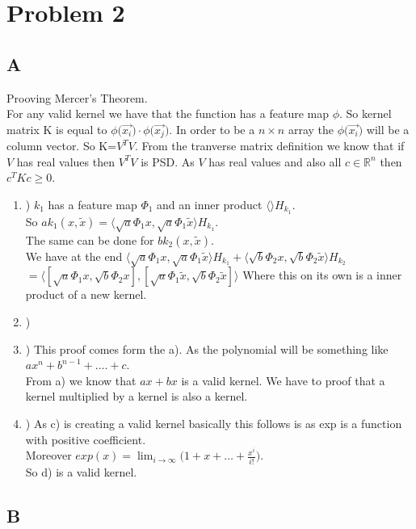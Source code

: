 \section{Problem 2}
\subsection{A}
Prooving Mercer's Theorem.\\
For any valid kernel we have that the function has a feature map $\phi$.
So kernel matrix K is equal to $\phi\big( \overrightarrow{x_i}\big) \cdot \phi\big( \overrightarrow{x_j}\big)$.
In order to be a $n\times n$ array the $\phi\big( \overrightarrow{x_i}\big)$ will be a column vector.
So K=$V^TV$. From the tranverse matrix definition we know that if $V$ has real values then $V^TV$ is 
PSD. As $V$ has real values and also all $c \in \mathbb{R}^n$ then $c^TKc \geq 0$.

\begin{enumerate}[label=\alph*]
\item) $k_1$ has a feature map $\Phi_1$ and an inner product $\langle\rangle H_{k_1}$.\\
So $ak_1(x,\widetilde{x}) = \langle \sqrt{a}\Phi_1{x}, \sqrt{a}\Phi_1{\widetilde{x}} \rangle H_{k_1}$. \\
The same can be done for $bk_2(x,\widetilde{x})$.\\
We have at the end 
$\langle \sqrt{a}\Phi_1{x}, \sqrt{a}\Phi_1{\widetilde{x}} \rangle H_{k_1} + \langle \sqrt{b}\Phi_2{x}, \sqrt{b}\Phi_2{\widetilde{x}} \rangle H_{k_2}$\\
$= \langle [\sqrt{a}\Phi_1{x},\sqrt{b}\Phi_2{x}], [\sqrt{a}\Phi_1{\widetilde{x}},\sqrt{b}\Phi_2{\widetilde{x}}] \rangle$
Where this on its own is a inner product of a new kernel.
\item) 
\item) This proof comes form the a). As the polynomial will be something like $ax^n+b^{n-1}+....+c$.\\
From a) we know that $ax+bx$ is a valid kernel. We have to proof that a kernel multiplied by a kernel
is also a kernel. 
\item) As c) is creating a valid kernel basically this follows is as exp is a function with positive coefficient.\\
Moreover $exp(x) = \lim_{i \to \infty} \big( 1+x+ \ldots + \frac{x^i}{i!} \big)$.\\
So d) is a valid kernel.
\end{enumerate}
\subsection{B}
